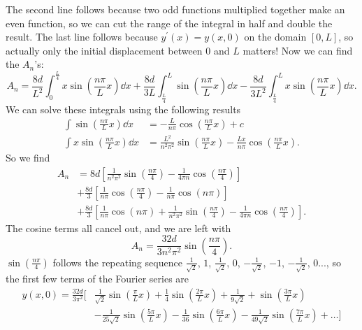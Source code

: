 \documentclass[../classical_mechanics.tex]{subfiles}
\begin{document}
            The second line follows because two odd functions multiplied together make an even function, so we can cut the range of the integral in half and double the result.
            The last line follows because $y^\prime(x)=y(x,0)$ on the domain $[0,L]$, so actually only the initial displacement between $0$ and $L$ matters!
            Now we can find the $A_n$'s:
            \begin{equation}
                A_n=\frac{8d}{L^2}\int_0^{\frac{L}{4}}x\sin\left(\frac{n\pi}{L}x\right)\dd{x}+\frac{8d}{3L}\int_{\frac{L}{4}}^L\sin\left(\frac{n\pi}{L}x\right)\dd{x}-\frac{8d}{3L^2}\int_{\frac{L}{4}}^L x\sin\left(\frac{n\pi}{L}x\right)\dd{x}.
            \end{equation}
            We can solve these integrals using the following results
            \begin{align}
                \int\sin\left(\frac{n\pi}{L}x\right)\dd{x}&=-\frac{L}{n\pi}\cos\left(\frac{n\pi}{L}x\right)+c\\
                \int x\sin\left(\frac{n\pi}{L}x\right)\dd{x}&=\frac{L^2}{n^2\pi^2}\sin\left(\frac{n\pi}{L}x\right)-\frac{Lx}{n\pi}\cos\left(\frac{n\pi}{L}x\right).
            \end{align}
            So we find
            \begin{equation}
                \begin{split}
                    A_n&=8d\left[\frac{1}{n^2\pi^2}\sin\left(\frac{n\pi}{4}\right)-\frac{1}{4\pi n}\cos\left(\frac{n\pi}{4}\right)\right]\\
                    &+\frac{8d}{3}\left[\frac{1}{n\pi}\cos\left(\frac{n\pi}{4}\right)-\frac{1}{n\pi}\cos(n\pi)\right]\\
                    &+\frac{8d}{3}\left[\frac{1}{n\pi}\cos(n\pi)+\frac{1}{n^2\pi^2}\sin\left(\frac{n\pi}{4}\right)-\frac{1}{4\pi n}\cos\left(\frac{n\pi}{4}\right)\right].
                \end{split}
            \end{equation}
            The cosine terms all cancel out, and we are left with
            \begin{equation}
                A_n=\frac{32d}{3n^2\pi^2}\sin\left(\frac{n\pi}{4}\right).
            \end{equation}
            $\sin\left(\frac{n\pi}{4}\right)$ follows the repeating sequence $\frac{1}{\sqrt{2}}$, $1$, $\frac{1}{\sqrt{2}}$, $0$, $-\frac{1}{\sqrt{2}}$, $-1$, $-\frac{1}{\sqrt{2}}$, $0$..., so the first few terms of the Fourier series are
            \begin{equation}
                \begin{split}
                    y(x,0)=\frac{32d}{3\pi^2}\biggl[&\frac{1}{\sqrt{2}}\sin\left(\frac{\pi}{L}x\right)+\frac{1}{4}\sin\left(\frac{2\pi}{L}x\right)+\frac{1}{9\sqrt{2}}+\sin\left(\frac{3\pi}{L}x\right)\\
                    &-\frac{1}{25\sqrt{2}}\sin\left(\frac{5\pi}{L}x\right)-\frac{1}{36}\sin\left(\frac{6\pi}{L}x\right)-\frac{1}{49\sqrt{2}}\sin\left(\frac{7\pi}{L}x\right)+\dots\biggr]
                \end{split}
            \end{equation}
\end{document}
